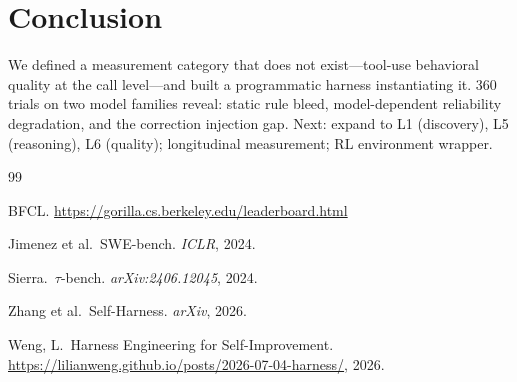 \documentclass[11pt]{article}
\begin{document}
\section{Conclusion}

We defined a measurement category that does not exist---tool-use behavioral
quality at the call level---and built a programmatic harness instantiating it.
360 trials on two model families reveal: static rule bleed, model-dependent
reliability degradation, and the correction injection gap. Next: expand to L1
(discovery), L5 (reasoning), L6 (quality); longitudinal measurement; RL
environment wrapper.


\begin{thebibliography}{99}

BFCL. \url{https://gorilla.cs.berkeley.edu/leaderboard.html}

Jimenez et al.\ SWE-bench. \textit{ICLR}, 2024.

Sierra.\ $\tau$-bench. \textit{arXiv:2406.12045}, 2024.

Zhang et al.\ Self-Harness. \textit{arXiv}, 2026.

Weng, L.\ Harness Engineering for Self-Improvement.
\url{https://lilianweng.github.io/posts/2026-07-04-harness/}, 2026.

\end{thebibliography}
\end{document}

